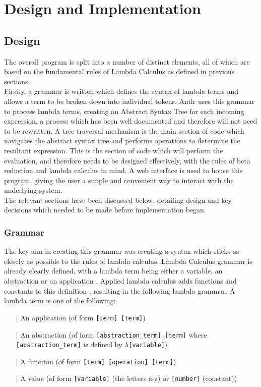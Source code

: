 \documentclass[a4paper,11pt]{report}
\begin{document}
\chapter{Design and Implementation}
\section{Design}

The overall program is split into a number of distinct elements, all of which are based on the fundamental rules of Lambda Calculus as defined in previous sections.\\

Firstly, a grammar is written which defines the syntax of lambda terms and allows a term to be broken down into individual tokens. Antlr uses this grammar to process lambda terms, creating an Abstract Syntax Tree for each incoming expression\cite{Parr2012}, a process which has been well documented and therefore will not need to be rewritten. A tree traversal mechanism is the main section of code which navigates the abstract syntax tree and performs operations to determine the resultant expression. This is the section of code which will perform the evaluation, and therefore needs to be designed effectively, with the rules of beta reduction and lambda calculus in mind. A web interface is used to house this program, giving the user a simple and convenient way to interact with the underlying system.\\

The relevant sections have been discussed below, detailing design and key decisions which needed to be made before implementation began. %

\subsection{Grammar}

The key aim in creating this grammar was creating a syntax which sticks as closely as possible to the rules of lambda calculus. Lambda Calculus grammar is already clearly defined, with a lambda term being either a variable, an abstraction or an application \cite{Hankin2004}. Applied lambda calculus adds functions and constants to this definition \cite{Slonneger1995}, resulting in the following lambda grammar. A lambda term is one of the following:

\begin{itemize}
\item[|] An application (of form \texttt{[term] [term]})
\item[|] An abstraction (of form \texttt{[abstraction_term].[term]} where \texttt{[abstraction_term]} is defined by \texttt{$\lambda$[variable]})
\item[|] A function (of form \texttt{[term] [operation] [term]})
\item[|] A value (of form \texttt{[variable]} (the letters a-z) or \texttt{[number]} (constant))
\end{itemize}
\end{document}
